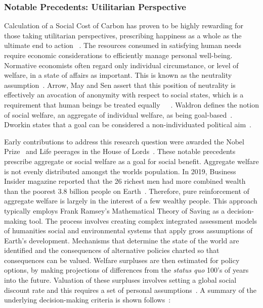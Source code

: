 \documentclass[11pt, oneside]{book}   	%
\begin{document}
\subsubsection{Notable Precedents: Utilitarian Perspective}

Calculation of a Social Cost of Carbon has proven to be highly rewarding for those taking utilitarian perspectives, prescribing happiness as a whole as the ultimate end to action ~\cite{hs1}. The resources consumed in satisfying human needs require economic considerations to efficiently manage personal well-being. Normative economists often regard only individual circumstance, or level of  welfare, in a state of affairs as important. This is known as the neutrality assumption~\cite{pd2}. Arrow, May and Sen assert that this position of neutrality is effectively an avocation of anonymity with respect to social states, which is a requirement that human beings be treated equally~\cite{ka1}~\cite{km1}~\cite{as2}. Waldron defines the notion of social welfare, an aggregate of individual welfare, as being goal-based~\cite{jw2}. Dworkin states that a goal can be considered a non-individuated political aim~\cite{rd1}.

Early contributions to address this research question were awarded the Nobel Prize~\cite{np1} and Life peerages in the House of Lords~\cite{g1}. These notable precedents prescribe aggregate or social welfare as a goal for social benefit. Aggregate welfare is not evenly distributed amongst the worlds population. In 2019, Business Insider magazine reported that the 26 richest men had more combined wealth than the poorest 3.8 billion people on Earth~\cite{bi1}. Therefore, pure reinforcement of aggregate welfare is largely in the interest of a few wealthy people. This approach typically employs Frank Ramsey's Mathematical Theory of Saving as a decision-making tool. The process involves creating complex integrated assessment models of humanities social and environmental systems that apply gross assumptions of Earth's development. Mechanisms that determine the state of the world are identified and the consequences of alternative policies charted so that consequences can be valued. Welfare surpluses are then estimated for policy options, by making projections of differences from the \emph{status quo} 100's of years into the future. Valuation of these surpluses involves setting a global social discount rate and this requires a set of personal assumptions~\cite{pd2}. A summary of the underlying decision-making criteria is shown follows~\cite{fr1}:
\end{document}
